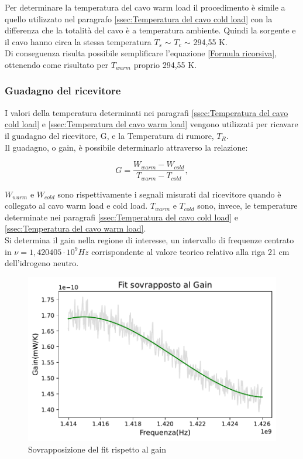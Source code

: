 Per determinare la temperatura del cavo warm load il procedimento è simile a quello utilizzato nel paragrafo \ref{ssec:Temperatura del cavo cold load} con la differenza che la totalità del cavo è a temperatura ambiente. Quindi la sorgente e il cavo hanno circa la stessa temperatura $T_{s}$ $\sim$ $T_{c}$ $\sim$ 294,55 K.\\
Di conseguenza risulta possibile semplificare l'equazione \eqref{Formula ricorsiva}, ottenendo come risultato per $ T_{warm} $ proprio 294,55 K.



\subsubsection{Guadagno del ricevitore}
\label{ssec:Guadagno del ricevitore}

I valori della temperatura determinati nei paragrafi \ref{ssec:Temperatura del cavo cold load} e  \ref{ssec:Temperatura del cavo warm load}  vengono utilizzati per ricavare il guadagno del ricevitore, G, e la Temperatura di rumore, $T_{R}$.\\
Il guadagno, o gain, è possibile determinarlo attraverso la relazione:

\begin{equation}
G = \dfrac{W_{warm}-W_{cold}}{T_{warm}-T_{cold}},
\label{Formula gain}
\end{equation}

$W_{warm}$ e $W_{cold}$ sono rispettivamente i segnali misurati dal ricevitore quando è collegato al cavo warm load e cold load.
$T_{warm}$ e $T_{cold}$ sono, invece, le temperature determinate nei paragrafi \ref{ssec:Temperatura del cavo cold load} e  \ref{ssec:Temperatura del cavo warm load}.\\
Si determina il gain nella regione di interesse, un intervallo di frequenze centrato in $\nu = 1,420405 \cdot  10^{9} Hz$ corrispondente al valore teorico relativo alla riga 21 cm dell'idrogeno neutro.

\begin{figure}[H]
	\centering
	\includegraphics[scale=0.8]{Fit_Gain.pdf}
	\caption{Sovrapposizione del fit rispetto al gain}
    	\label{fig:Fit_Gain}
\end{figure}

